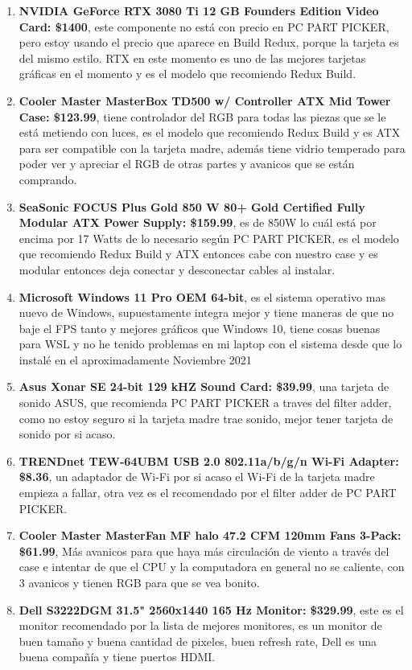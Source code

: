 \documentclass[12pt, a4paper]{article}
\begin{document}
\begin{enumerate}
    \item \textbf{NVIDIA GeForce RTX 3080 Ti 12 GB Founders Edition Video Card: \$1400}, este componente no está con precio en PC PART PICKER, pero estoy usando el precio que aparece en Build Redux, porque la tarjeta es del mismo estilo. RTX en este momento es uno de las mejores tarjetas gráficas en el momento y es el modelo que recomiendo Redux Build.
    \item \textbf{Cooler Master MasterBox TD500 w/ Controller ATX Mid Tower Case: \$123.99}, tiene controlador del RGB para todas las piezas que se le está metiendo con luces, es el modelo que recomiendo Redux Build y es ATX para ser compatible con la tarjeta madre, además tiene vidrio temperado para poder ver y apreciar el RGB de otras partes y avanicos que se están comprando.
    \item \textbf{SeaSonic FOCUS Plus Gold 850 W 80+ Gold Certified Fully Modular ATX Power Supply: \$159.99}, es de 850W lo cuál está por encima por 17 Watts de lo necesario según PC PART PICKER, es el modelo que recomiendo Redux Build y ATX entonces cabe con nuestro case y es modular entonces deja conectar y desconectar cables al instalar.
    \item \textbf{Microsoft Windows 11 Pro OEM 64-bit}, es el sistema operativo mas nuevo de Windows, supuestamente integra mejor y tiene maneras de que no baje el FPS tanto y mejores gráficos que Windows 10, tiene cosas buenas para WSL y no he tenido problemas en mi laptop con el sistema desde que lo instalé en el aproximadamente Noviembre 2021
    \item \textbf{Asus Xonar SE 24-bit 129 kHZ Sound Card: \$39.99}, una tarjeta de sonido ASUS, que recomienda PC PART PICKER a traves del filter adder, como no estoy seguro si la tarjeta madre trae sonido, mejor tener tarjeta de sonido por si acaso.
    \item \textbf{TRENDnet TEW-64UBM USB 2.0 802.11a/b/g/n Wi-Fi Adapter: \$8.36}, un adaptador de Wi-Fi por si acaso el Wi-Fi de la tarjeta madre empieza a fallar, otra vez es el recomendado por el filter adder de PC PART PICKER.
    \item \textbf{Cooler Master MasterFan MF halo 47.2 CFM 120mm Fans 3-Pack: \$61.99}, Más avanicos para que haya más circulación de viento a través del case e intentar de que el CPU y la computadora en general no se caliente, con 3 avanicos y tienen RGB para que se vea bonito.
    \item \textbf{Dell S3222DGM 31.5" 2560x1440 165 Hz Monitor: \$329.99}, este es el monitor recomendado por la lista de mejores monitores, es un monitor de buen tamaño y buena cantidad de pixeles, buen refresh rate, Dell es una buena compañía y tiene puertos HDMI.

\end{enumerate}
\end{document}
